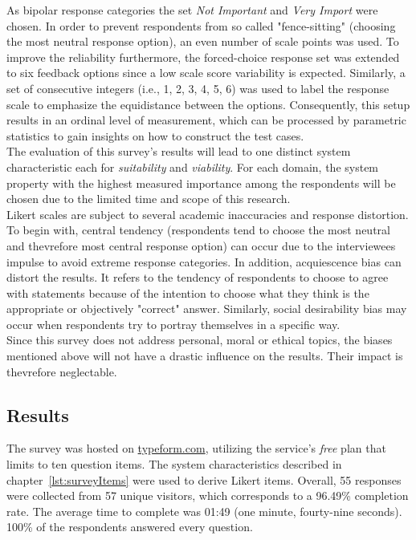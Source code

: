 As bipolar response categories the set \textit{Not Important} and \textit{Very Import} were chosen. In order to prevent respondents from so called "fence-sitting" (choosing the most neutral response option), an even number of scale points was used. To improve the reliability furthermore, the forced-choice response set was extended to six feedback options since a low scale score variability is expected.\autocite{Brill2008LikertScale} Similarly, a set of consecutive integers (i.e., 1, 2, 3, 4, 5, 6) was used to label the response scale to emphasize the equidistance between the options. Consequently, this setup results in an ordinal level of measurement, which can be processed by parametric statistics to gain insights on how to construct the test cases. \\
The evaluation of this survey's results will lead to one distinct system characteristic each for \textit{suitability} and \textit{viability}. For each domain, the system property with the highest measured importance among the respondents will be chosen due to the limited time and scope of this research. \\
Likert scales are subject to several academic inaccuracies and response distortion. To begin with, central tendency (respondents tend to choose the most neutral and thevrefore most central response option\autocite{Schumacker2013CentralDispersion}) can occur due to the interviewees impulse to avoid extreme response categories. In addition, acquiescence bias can distort the results. It refers to the tendency of respondents to choose to agree with statements because of the intention to choose what they think is the appropriate or objectively "correct" answer.\autocite{Costello2015AcquiescenceEducation}\highcomma\autocite{Aichholzer2015ControllingTests} Similarly, social desirability bias may occur when respondents try to portray themselves in a specific way.\autocite{Grimm2010SocialBias} \\
Since this survey does not address personal, moral or ethical topics, the biases mentioned above will not have a drastic influence on the results. Their impact is thevrefore neglectable. 


\subsection{Results}

The survey was hosted on \url{typeform.com}, utilizing the service's \textit{free} plan that limits to ten question items. The system characteristics described in chapter~\vref{lst:surveyItems} were used to derive Likert items. 
Overall,
55 responses were collected from
57 unique visitors, which corresponds to a
96.49\% completion rate. The average time to complete was 
01:49 (one minute, fourty-nine seconds).
100\% of the respondents answered every question.

